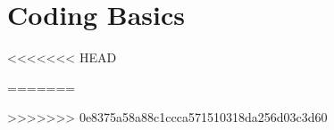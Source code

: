 
\chapter{Coding Basics}




<<<<<<< HEAD

=======

>>>>>>> 0e8375a58a88c1ccca571510318da256d03c3d60
